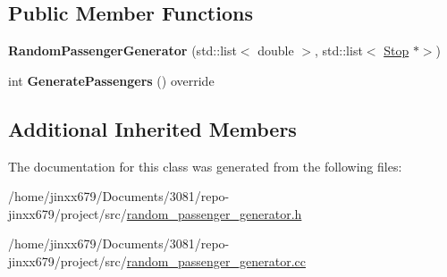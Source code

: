 \subsection*{Public Member Functions}
\begin{DoxyCompactItemize}
\item 
\mbox{\label{classRandomPassengerGenerator_a1be1b4abfe82bfe95eb0a078d9a3342d}} 
{\bfseries Random\+Passenger\+Generator} (std\+::list$<$ double $>$, std\+::list$<$ \hyperlink{classStop}{Stop} $\ast$$>$)
\item 
\mbox{\label{classRandomPassengerGenerator_aba2d80cde33371cf9c3d033f1b8ba6b8}} 
int {\bfseries Generate\+Passengers} () override
\end{DoxyCompactItemize}
\subsection*{Additional Inherited Members}


The documentation for this class was generated from the following files\+:\begin{DoxyCompactItemize}
\item 
/home/jinxx679/\+Documents/3081/repo-\/jinxx679/project/src/\hyperlink{random__passenger__generator_8h}{random\+\_\+passenger\+\_\+generator.\+h}\item 
/home/jinxx679/\+Documents/3081/repo-\/jinxx679/project/src/\hyperlink{random__passenger__generator_8cc}{random\+\_\+passenger\+\_\+generator.\+cc}\end{DoxyCompactItemize}
